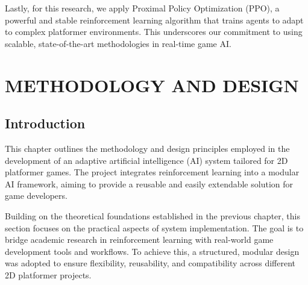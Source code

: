 \documentclass[12pt,oneside,openright,a4paper]{cpe-english-project}
\begin{document}
Lastly, for this research, we apply Proximal Policy Optimization (PPO), a powerful and stable reinforcement learning algorithm that trains agents to adapt to complex platformer environments. This underscores our commitment to using scalable, state-of-the-art methodologies in real-time game AI.\par




\chapter{METHODOLOGY AND DESIGN}

\section{Introduction}

This chapter outlines the methodology and design principles employed in the development of an adaptive artificial intelligence (AI) system tailored for 2D platformer games. The project integrates reinforcement learning into a modular AI framework, aiming to provide a reusable and easily extendable solution for game developers.\par

Building on the theoretical foundations established in the previous chapter, this section focuses on the practical aspects of system implementation. The goal is to bridge academic research in reinforcement learning with real-world game development tools and workflows. To achieve this, a structured, modular design was adopted to ensure flexibility, reusability, and compatibility across different 2D platformer projects.\par
\end{document}
